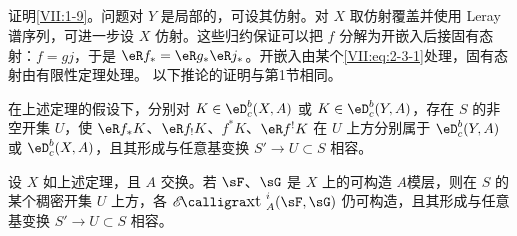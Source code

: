 \subsection{}\label{VII:2-8}
证明\ref{VII:1-9}。问题对 $Y$ 是局部的，可设其仿射。对 $X$ 取仿射覆盖并使用 Leray 谱序列，可进一步设 $X$ 仿射。这些归约保证可以把 $f$ 分解为开嵌入后接固有态射：$f=gj$，于是 $\eR f_\ast=\eR g_\ast\eR j_\ast$。开嵌入由某个\eqref{VII:eq:2-3-1}处理，固有态射由有限性定理处理。
以下推论的证明与第1节相同。
\begin{corollary_}\label{VII:2-9}
在上述定理的假设下，分别对 $K\in\eD_c^b(X,A)$ 或 $K\in\eD_c^b(Y,A)$，存在 $S$ 的非空开集 $U$，使 $\eR f_\ast K$、$\eR f_!K$、$f^\ast K$、$\eR f^!K$ 在 $U$ 上方分别属于 $\eD_c^b(Y,A)$ 或 $\eD_c^b(X,A)$，且其形成与任意基变换 $S'\to U\subset S$ 相容。
\end{corollary_}
\begin{corollary_}\label{VII:2-10}
设 $X$ 如上述定理，且 $A$ 交换。若 $\sF$、$\sG$ 是 $X$ 上的可构造 $A$模层，则在 $S$ 的某个稠密开集 $U$ 上方，各 $\Ext_A^i(\sF,\sG)$ 仍可构造，且其形成与任意基变换 $S'\to U\subset S$ 相容。
\end{corollary_}
